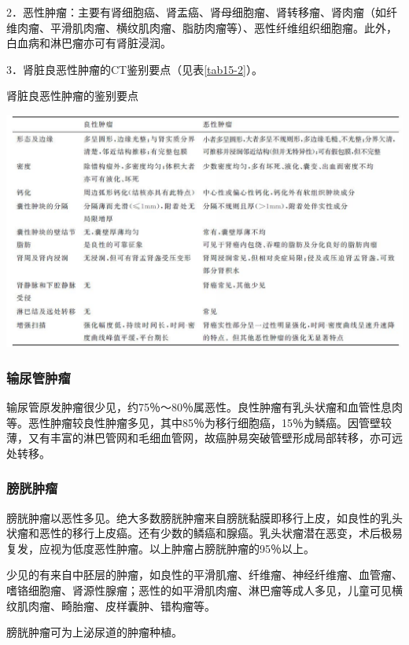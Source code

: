 2．恶性肿瘤：主要有肾细胞癌、肾盂癌、肾母细胞瘤、肾转移瘤、肾肉瘤（如纤维肉瘤、平滑肌肉瘤、横纹肌肉瘤、脂肪肉瘤等）、恶性纤维组织细胞瘤。此外，白血病和淋巴瘤亦可有肾脏浸润。

3．肾脏良恶性肿瘤的CT鉴别要点（见表\ref{tab15-2}）。

\begin{table}[htbp]
\centering
\caption{肾脏良恶性肿瘤的鉴别要点}
\label{tab15-2}
\includegraphics[width=\textwidth,height=\textheight,keepaspectratio]{./images/Image00335.jpg}
\end{table}

\subsubsection{输尿管肿瘤}

输尿管原发肿瘤很少见，约75％～80％属恶性。良性肿瘤有乳头状瘤和血管性息肉等。恶性肿瘤较良性肿瘤多见，其中85％为移行细胞癌，15％为鳞癌。因管壁较薄，又有丰富的淋巴管网和毛细血管网，故癌肿易突破管壁形成局部转移，亦可远处转移。

\subsubsection{膀胱肿瘤}

膀胱肿瘤以恶性多见。绝大多数膀胱肿瘤来自膀胱黏膜即移行上皮，如良性的乳头状瘤和恶性的移行上皮癌。还有少数的鳞癌和腺癌。乳头状瘤潜在恶变，术后极易复发，应视为低度恶性肿瘤。以上肿瘤占膀胱肿瘤的95％以上。

少见的有来自中胚层的肿瘤，如良性的平滑肌瘤、纤维瘤、神经纤维瘤、血管瘤、嗜铬细胞瘤、肾源性腺瘤；恶性的如平滑肌肉瘤、淋巴瘤等成人多见，儿童可见横纹肌肉瘤、畸胎瘤、皮样囊肿、错构瘤等。

膀胱肿瘤可为上泌尿道的肿瘤种植。


